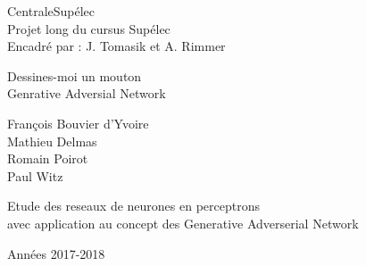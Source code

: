 
\begin{titlepage}

\setlength{\hoffset}{-1in}
\setlength{\voffset}{-1in}
\setlength{\topmargin}{1.5cm}
\setlength{\headheight}{0.5cm}
\setlength{\headsep}{1cm}
\setlength{\oddsidemargin}{3cm}
\setlength{\evensidemargin}{3cm}
\setlength{\footskip}{1.5cm}
\enlargethispage{1cm}

\fontsize{12pt}{14pt}
\selectfont

\begin{center}


\vspace{0.5cm}

CentraleSupélec\\
Projet long du cursus Supélec\\
Encadré par : J. Tomasik et A. Rimmer

\vspace{3.5cm}

\fontsize{17.28pt}{21pt}
\selectfont

Dessines-moi un mouton\\
Genrative Adversial Network

\fontsize{12pt}{14pt}
\selectfont

\vspace{.6cm}



\vspace{.4cm}



\vspace{3.5cm}

François Bouvier d'Yvoire\\
Mathieu Delmas \\
Romain Poirot \\
Paul Witz

\vspace{2cm}

Etude des reseaux de neurones en perceptrons \\ avec application au concept des Generative Adverserial Network


\vspace{1cm}

Années 2017-2018

\end{center}
\end{titlepage}
